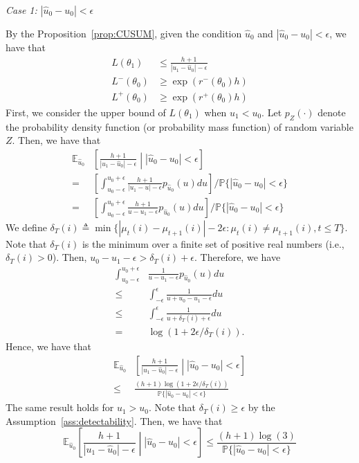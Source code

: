 \documentclass[letterpaper]{article} %
\begin{document}
\emph{Case 1:} $|\hat{u}_0-u_0|<\epsilon$

By the Proposition~\ref{prop:CUSUM}, given the condition $\hat{u}_0$ and $|\hat{u}_0-u_0|<\epsilon$, we have that
\begin{align}
L(\theta_1)&\leq \frac{h+1}{|u_1-\hat{u}_0|-\epsilon}\\
L^-(\theta_0)&\geq \exp(r^-(\theta_0)h)\\
L^+(\theta_0)&\geq \exp(r^+(\theta_0)h)
\end{align}
First, we consider the upper bound of $L(\theta_1)$ when $u_1<u_0$. Let $p_{Z}(\cdot)$ denote the probability density function (or probability mass function) of random variable $Z$. Then, we have that
\begin{align}
\mathbb{E}_{\hat{u}_0}&\left[\frac{h+1}{|u_1-\hat{u}_0|-\epsilon}\middle||\hat{u}_0-u_0|<\epsilon\right]\\
=&\left[\int_{u_0-\epsilon}^{u_0+\epsilon}\frac{h+1}{|u_1-u|-\epsilon}p_{\hat{u}_0}(u)du\right]/\mathbb{P}\{|\hat{u}_0-u_0|<\epsilon\}\\
=&\left[\int_{u_0-\epsilon}^{u_0+\epsilon}\frac{h+1}{u-u_1-\epsilon}p_{\hat{u}_0}(u)du\right]/\mathbb{P}\{|\hat{u}_0-u_0|<\epsilon\}
\end{align}
We define
$\delta_T(i)\triangleq\min\{|\mu_t(i)-\mu_{t+1}(i)|-2\epsilon:\mu_t(i)\neq
\mu_{t+1}(i), t\leq T\}$. Note that $\delta_T(i)$ is the minimum over a finite set of positive
real numbers (i.e., $\delta_T(i)>0$). Then,
$u_0-u_1-\epsilon>\delta_T(i)+\epsilon$. Therefore, we have 
\begin{align}
\int_{u_0-\epsilon}^{u_0+\epsilon}&\frac{1}{u-u_1-\epsilon}p_{\hat{u}_0}(u)du\\
\leq&\int_{-\epsilon}^{\epsilon}\frac{1}{u+u_0-u_1-\epsilon}du\\
\leq&\int_{-\epsilon}^{\epsilon}\frac{1}{u+\delta_T(i)+\epsilon}du\\
=&\log(1+2\epsilon/\delta_T(i)).
\end{align}
Hence, we have that
\begin{align}
\mathbb{E}_{\hat{u}_0}&\left[\frac{h+1}{|u_1-\hat{u}_0|-\epsilon}\middle||\hat{u}_0-u_0|<\epsilon\right]\\
\leq&\frac{(h+1)\log(1+2\epsilon/\delta_T(i))}{\mathbb{P}\{|\hat{u}_0-u_0|<\epsilon\}}
\end{align}
The same result holds for $u_1>u_0$. Note that $\delta_T(i)\geq\epsilon$ by the Assumption~\ref{ass:detectability}. Then, we have that
\begin{equation}\label{case1D}
\mathbb{E}_{\hat{u}_0}\left[\frac{h+1}{|u_1-\hat{u}_0|-\epsilon}\middle||\hat{u}_0-u_0|<\epsilon\right]\leq\frac{(h+1)\log(3)}{\mathbb{P}\{|\hat{u}_0-u_0|<\epsilon\}}
\end{equation}
\end{document}
